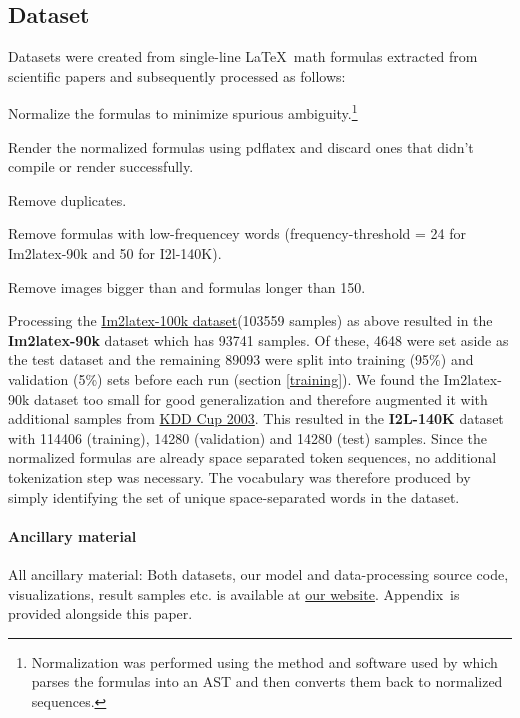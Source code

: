 \documentclass{article}
\newcommand{\website}{https://untrix.github.io/i2l/}
\newcommand{\Suppmat}{Appendix}
\begin{document}
\subsection{Dataset}
\label{dataset}
Datasets were created from single-line \LaTeX ~math formulas extracted from scientific papers and subsequently processed as follows:
\begin{enumerate*}[label=\arabic*)]
	\item Normalize the formulas to minimize spurious ambiguity.\footnote{Normalization was performed using the method and software used by \cite{Deng2017ImagetoMarkupGW} which parses the formulas into an AST and then converts them back to normalized sequences.}
	\item Render the normalized formulas using pdflatex and discard ones that didn't compile or render successfully.
	\item Remove duplicates.
	\item Remove formulas with low-frequencey words (frequency-threshold = 24 for Im2latex-90k and 50 for I2l-140K).
	\item Remove images bigger than  and formulas longer than 150.
\end{enumerate*}
Processing the \href{https://zenodo.org/record/56198\#.WnzcT3UbMQ9}{Im2latex-100k dataset}\footnotemark[104] (103559 samples) as above resulted in the \textbf{Im2latex-90k} dataset which has 93741 samples. Of these, 4648 were set aside as the test dataset and the remaining 89093 were split into training (95\%) and validation (5\%) sets before each run (section \ref{training}).
We found the {Im2latex-90k} dataset too small for good generalization and therefore augmented it with additional samples from \href{http://www.cs.cornell.edu/projects/kddcup/datasets.html}{KDD Cup 2003}. This resulted in the \textbf{I2L-140K} dataset with 114406 (training), 14280 (validation) and 14280 (test) samples. Since the normalized formulas are already space separated token sequences, no additional tokenization step was necessary. The vocabulary was therefore produced by simply identifying the set of unique space-separated words in the dataset.
\paragraph{Ancillary material}
All ancillary material: Both datasets, our model and data-processing source code, visualizations, result samples etc. is available at \href{\website}{our website}. \Suppmat ~is provided alongside this paper.
\end{document}
